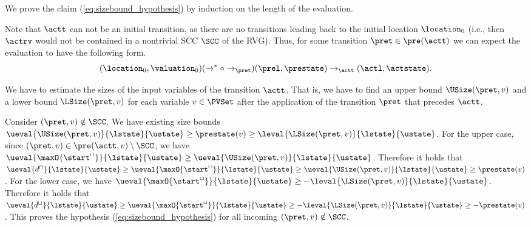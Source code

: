 We prove the claim (\ref{eq:sizebound_hypothesis}) by induction on the length of the evaluation.

Note that $\actt$ can not be an initial transition, as there are no transitions leading back to the initial location $\location_0$
(i.e., then $\actrv$ would not be contained in a nontrivial SCC $\SCC$ of the RVG).
Thus, for some transition $\pret \in \pre(\actt)$ we can expect the evaluation to have the following form.
\[ (\location_0, \valuation_0) (\rightarrow^* \circ \rightarrow_\pret) (\prel, \prestate) \rightarrow_\actt (\actl, \actstate). \]

We have to estimate the sizes of the input variables of the transition $\actt$.
That is, we have to find an upper bound $\USize(\pret, v)$ and a lower bound $\LSize(\pret, v)$ for each variable $v \in \PVSet$ after the application of the transition $\pret$ that precedes $\actt$.

Consider $(\pret, v) \notin \SCC$.
We have existing size bounds $\ueval{\USize(\pret, v)}{\lstate}{\ustate} \geq \prestate(v) \geq \leval{\LSize(\pret, v)}{\lstate}{\ustate}$.
For the upper case, since $(\pret, v) \in \pre(\actt, v) \setminus \SCC$, we have $\ueval{\maxO{\start^\sqcap}}{\lstate}{\ustate} \geq \ueval{\USize(\pret, v)}{\lstate}{\ustate}$.
Therefore it holds that $\ueval{d^\sqcap}{\lstate}{\ustate} \geq \ueval{\maxO{\start^\sqcap}}{\lstate}{\ustate} \geq \ueval{\USize(\pret, v)}{\lstate}{\ustate} \geq \prestate(v)$.
For the lower case, we have $\ueval{\maxO{\start^\sqcup}}{\lstate}{\ustate} \geq -\leval{\LSize(\pret, v)}{\lstate}{\ustate}$.
Therefore it holds that $\ueval{d^\sqcup}{\lstate}{\ustate} \geq \ueval{\maxO{\start^\sqcup}}{\lstate}{\ustate} \geq -\leval{\LSize(\pret, v)}{\lstate}{\ustate} \geq -\prestate(v)$.
This proves the hypothesis (\ref{eq:sizebound_hypothesis}) for all incoming $(\pret, v) \notin \SCC$.

